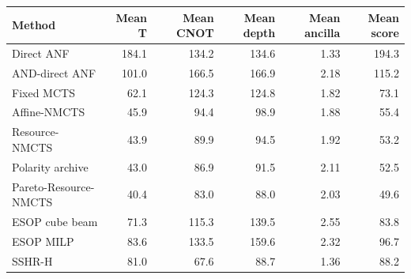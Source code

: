 \begin{tabular}{lrrrrr}
\toprule
Method & Mean T & Mean CNOT & Mean depth & Mean ancilla & Mean score \\
\midrule
Direct ANF & 184.1 & 134.2 & 134.6 & 1.33 & 194.3 \\
AND-direct ANF & 101.0 & 166.5 & 166.9 & 2.18 & 115.2 \\
Fixed MCTS & 62.1 & 124.3 & 124.8 & 1.82 & 73.1 \\
Affine-NMCTS & 45.9 & 94.4 & 98.9 & 1.88 & 55.4 \\
Resource-NMCTS & 43.9 & 89.9 & 94.5 & 1.92 & 53.2 \\
Polarity archive & 43.0 & 86.9 & 91.5 & 2.11 & 52.5 \\
Pareto-Resource-NMCTS & 40.4 & 83.0 & 88.0 & 2.03 & 49.6 \\
ESOP cube beam & 71.3 & 115.3 & 139.5 & 2.55 & 83.8 \\
ESOP MILP & 83.6 & 133.5 & 159.6 & 2.32 & 96.7 \\
SSHR-H & 81.0 & 67.6 & 88.7 & 1.36 & 88.2 \\
\bottomrule
\end{tabular}
